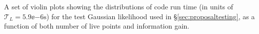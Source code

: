 \label{fig:timings}
A set of violin plots showing the distributions of code run time (in units of
$\mathcal{T}_L = 5.9\ee{-6} \text{s}$) for the test Gaussian likelihood
used in \S\ref{sec:proposaltesting}, as a function of both number of live points and
information gain.
